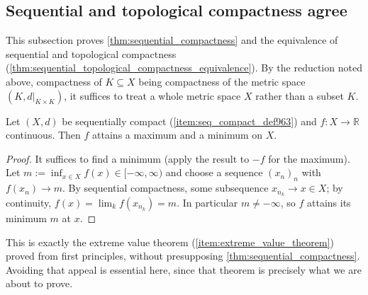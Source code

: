 
\subsection{Sequential and topological compactness agree}

This subsection proves \cref{thm:sequential_compactness} and the equivalence of sequential and
topological compactness (\cref{thm:sequential_topological_compactness_equivalence}). By the reduction
noted above, compactness of $K \subseteq X$ being compactness of the metric space
$(K,d|_{K\times K})$, it suffices to treat a whole metric space $X$ rather than a subset $K$.

\begin{lemma}
\label{lem:sequential_compactness_extreme_values}
Let $(X,d)$ be sequentially compact (\cref{item:seq_compact_def963}) and $f : X \to \mathbb{R}$
continuous. Then $f$ attains a maximum and a minimum on $X$.
\end{lemma}

\begin{proof}
It suffices to find a minimum (apply the result to $-f$ for the maximum). Let
$m := \inf_{x\in X} f(x) \in [-\infty,\infty)$ and choose a sequence $(x_n)_{n}$ with
$f(x_n) \to m$. By sequential compactness, some subsequence $x_{n_k} \to x \in X$; by continuity,
$f(x) = \lim_k f(x_{n_k}) = m$. In particular $m \neq -\infty$, so $f$ attains its minimum $m$ at
$x$.
\end{proof}

\begin{remark}
This is exactly the extreme value theorem (\cref{item:extreme_value_theorem}) proved from first
principles, without presupposing \cref{thm:sequential_compactness}. Avoiding that appeal is
essential here, since that theorem is precisely what we are about to prove.
\end{remark}

